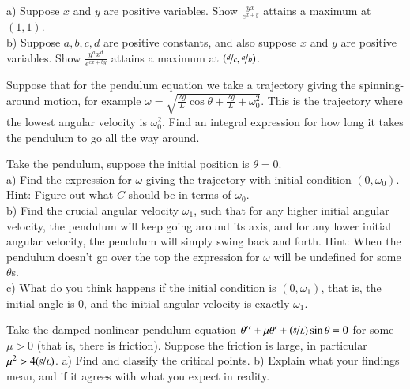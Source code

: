 \documentclass[12pt]{book}
\begin{document}
\begin{exercise}
a) Suppose $x$ and $y$ are
positive variables.  Show $\frac{y x}{e^{x+y}}$
attains a maximum at $(1,1)$.\\
b) Suppose $a,b,c,d$ are positive constants, and also suppose $x$ and $y$ are
positive variables.  Show $\frac{y^a x^d}{e^{cx+by}}$
attains a maximum at $(\nicefrac{d}{c},\nicefrac{a}{b})$.
\end{exercise}

\begin{exercise}
Suppose that for the pendulum equation we take a trajectory giving the
spinning-around motion, for example $\omega = \sqrt{\frac{2g}{L} \cos \theta
+ \frac{2g}{L} + \omega_0^2}$.  This is the trajectory where the lowest
angular velocity is $\omega_0^2$.  Find an integral expression for how long it takes
the pendulum to go all the way around.
\end{exercise}


\begin{exercise}[challenging]
Take the pendulum, suppose the initial position is $\theta = 0$. \\
a) Find the expression for $\omega$ giving the trajectory
with initial condition $(0,\omega_0)$.  Hint: Figure out what $C$
should be in terms of $\omega_0$.\\
b) Find the crucial angular velocity $\omega_1$, such that
for any higher initial angular velocity,
the pendulum will keep going around its
axis, and for any lower initial angular velocity, the pendulum will simply
swing back and forth.
Hint: When the pendulum doesn't go over the top the expression for $\omega$
will be undefined for some $\theta$s.
\\
c) What do you think happens if the initial condition is $(0,\omega_1)$,
that is, the initial angle is 0, and the initial angular velocity is exactly
$\omega_1$.
\end{exercise}

\setcounter{exercise}{100}

\begin{exercise}
Take the damped nonlinear pendulum equation $\theta '' + \mu \theta' +
(\nicefrac{g}{L})
\sin \theta = 0$ for some $\mu > 0$ (that is, there is friction).
Suppose the friction is large, in particular $\mu^2 > 4 (\nicefrac{g}{L})$.
a) Find and classify the critical points.
b) Explain what your findings mean, and if it agrees with what you
expect in reality.
\end{exercise}
\end{document}
